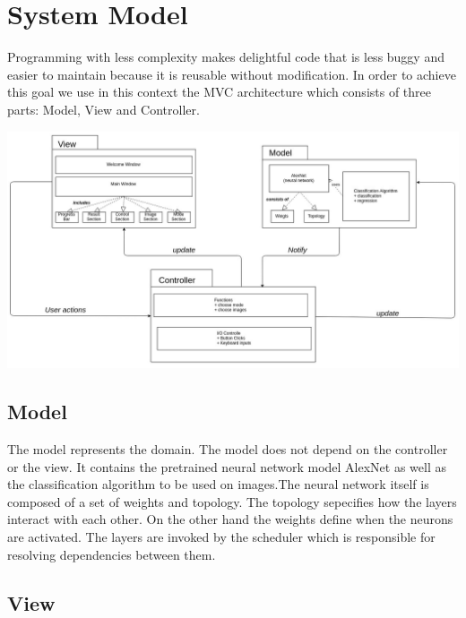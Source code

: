 \documentclass[parskip=full]{scrartcl}
\begin{document}
\pagebreak





\section{System Model}

Programming with less complexity makes delightful code that is less buggy and easier to maintain because it is reusable without modification. In order to achieve this goal we use in this context the MVC architecture which consists of three parts: Model, View and Controller.

\begin{center}
\includegraphics[width=1.0\textwidth]{images/MVC.png}
\end{center}

\subsection{Model}

The model represents the domain. The model does not depend on the controller or the view. It contains the pretrained neural network model AlexNet as well as the classification algorithm to be used on images.The neural network itself is composed of a set of weights and topology. The topology sepecifies how the layers interact with each other. On the other hand the weights define when the neurons are activated. The layers are invoked by the scheduler which is responsible for resolving dependencies between them.

\pagebreak



\subsection{View}
\end{document}
